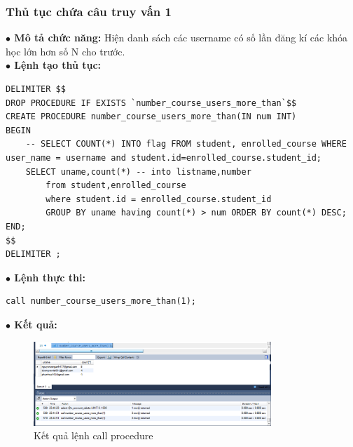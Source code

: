\documentclass[12pt,a4paper,titlepage]{article}
\begin{document}
\subsubsection{Thủ tục chứa câu truy vấn 1}
\textbf{$\bullet$ Mô tả chức năng:} Hiện danh sách các username có số lần đăng kí các khóa học lớn hơn số N cho trước.\\
\textbf{$\bullet$ Lệnh tạo thủ tục:}
\begin{lstlisting}
DELIMITER $$
DROP PROCEDURE IF EXISTS `number_course_users_more_than`$$
CREATE PROCEDURE number_course_users_more_than(IN num INT)
BEGIN
    -- SELECT COUNT(*) INTO flag FROM student, enrolled_course WHERE user_name = username and student.id=enrolled_course.student_id;
    SELECT uname,count(*) -- into listname,number 
		from student,enrolled_course 
		where student.id = enrolled_course.student_id 
		GROUP BY uname having count(*) > num ORDER BY count(*) DESC;
END;
$$
DELIMITER ;
\end{lstlisting}
\textbf{$\bullet$ Lệnh thực thi:}
\begin{lstlisting}
call number_course_users_more_than(1);
\end{lstlisting}
\textbf{$\bullet$ Kết quả:}
\newpage
\begin{figure}[h!]
	\centering
	\caption{Kết quả lệnh call procedure}
	\includegraphics[width=0.8\textwidth]{images/image9.png}
\end{figure}
\end{document}
